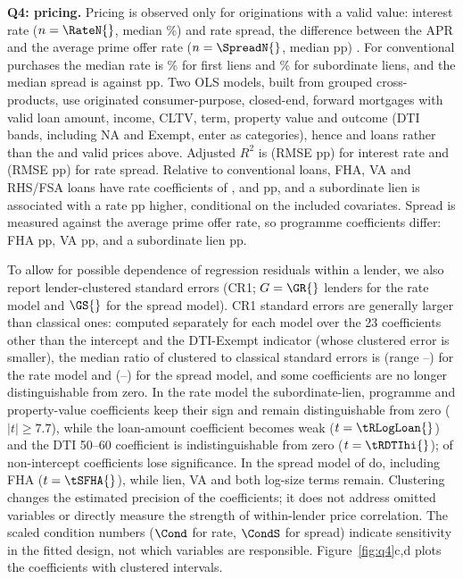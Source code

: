 \documentclass[acmtog,nonacm]{acmart}
\begin{document}
\textbf{Q4: pricing.} Pricing is observed only for originations with a valid value: interest rate ($n=\RateN{}$, median \RateMed\%) and rate spread, the difference between the APR and the average prime offer rate ($n=\SpreadN{}$, median \SpreadMed{} pp) \cite{ffieclar}. For conventional purchases the median rate is \CPRateI{}\% for first liens and \CPRateII{}\% for subordinate liens, and the median spread is \CPSpreadI{} against \CPSpreadII{} pp. Two OLS models, built from grouped cross-products, use originated consumer-purpose, closed-end, forward mortgages with valid loan amount, income, CLTV, term, property value and outcome (DTI bands, including NA and Exempt, enter as categories), hence \QRn{} and \QSn{} loans rather than the \RateN{} and \SpreadN{} valid prices above. Adjusted $R^2$ is \QRrII{} (RMSE \QRrmse{} pp) for interest rate and \QSrII{} (RMSE \QSrmse{} pp) for rate spread. Relative to conventional loans, FHA, VA and RHS/FSA loans have rate coefficients of \cFHA, \cVA{} and \cRHS{} pp, and a subordinate lien is associated with a rate \rLien{} pp higher, conditional on the included covariates. Spread is measured against the average prime offer rate, so programme coefficients differ: FHA \sFHA{} pp, VA \sVA{} pp, and a subordinate lien \sLien{} pp.

To allow for possible dependence of regression residuals within a lender, we also report lender-clustered standard errors (CR1; $G=\GR{}$ lenders for the rate model and $\GS{}$ for the spread model). CR1 standard errors are generally larger than classical ones: computed separately for each model over the 23 coefficients other than the intercept and the DTI-Exempt indicator (whose clustered error is smaller), the median ratio of clustered to classical standard errors is \RatioRMed{} (range \RatioRMin--\RatioRMax) for the rate model and \RatioSMed{} (\RatioSMin--\RatioSMax) for the spread model, and some coefficients are no longer distinguishable from zero. In the rate model the subordinate-lien, programme and property-value coefficients keep their sign and remain distinguishable from zero ($|t|\ge7.7$), while the loan-amount coefficient becomes weak ($t=\tRLogLoan{}$) and the DTI 50--60 coefficient is indistinguishable from zero ($t=\tRDTIhi{}$); \LoseR{} of \NTermsR{} non-intercept coefficients lose significance. In the spread model \LoseS{} of \NTermsS{} do, including FHA ($t=\tSFHA{}$), while lien, VA and both log-size terms remain. Clustering changes the estimated precision of the coefficients; it does not address omitted variables or directly measure the strength of within-lender price correlation. The scaled condition numbers ($\Cond$ for rate, $\CondS$ for spread) indicate sensitivity in the fitted design, not which variables are responsible. Figure~\ref{fig:q4}c,d plots the coefficients with clustered intervals.
\end{document}
